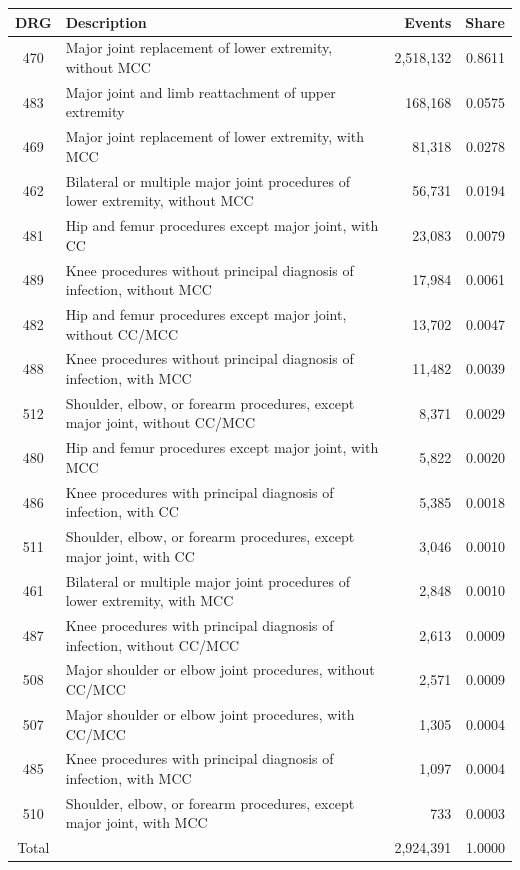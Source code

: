 \begin{tabular}{clrr}
\hline
DRG & Description & Events & Share \\
\hline\hline
470 & Major joint replacement of lower extremity, without MCC & 2,518,132 & 0.8611 \\
483 & Major joint and limb reattachment of upper extremity & 168,168 & 0.0575 \\
469 & Major joint replacement of lower extremity, with MCC & 81,318 & 0.0278 \\
462 & Bilateral or multiple major joint procedures of lower extremity, without MCC & 56,731 & 0.0194 \\
481 & Hip and femur procedures except major joint, with CC & 23,083 & 0.0079 \\
489 & Knee procedures without principal diagnosis of infection, without MCC & 17,984 & 0.0061 \\
482 & Hip and femur procedures except major joint, without CC/MCC & 13,702 & 0.0047 \\
488 & Knee procedures without principal diagnosis of infection, with MCC & 11,482 & 0.0039 \\
512 & Shoulder, elbow, or forearm procedures, except major joint, without CC/MCC & 8,371 & 0.0029 \\
480 & Hip and femur procedures except major joint, with MCC & 5,822 & 0.0020 \\
486 & Knee procedures with principal diagnosis of infection, with CC & 5,385 & 0.0018 \\
511 & Shoulder, elbow, or forearm procedures, except major joint, with CC & 3,046 & 0.0010 \\
461 & Bilateral or multiple major joint procedures of lower extremity, with MCC & 2,848 & 0.0010 \\
487 & Knee procedures with principal diagnosis of infection, without CC/MCC & 2,613 & 0.0009 \\
508 & Major shoulder or elbow joint procedures, without CC/MCC & 2,571 & 0.0009 \\
507 & Major shoulder or elbow joint procedures, with CC/MCC & 1,305 & 0.0004 \\
485 & Knee procedures with principal diagnosis of infection, with MCC & 1,097 & 0.0004 \\
510 & Shoulder, elbow, or forearm procedures, except major joint, with MCC & 733 & 0.0003 \\
\hline\hline
Total & & 2,924,391 & 1.0000 \\
\hline
\end{tabular}
